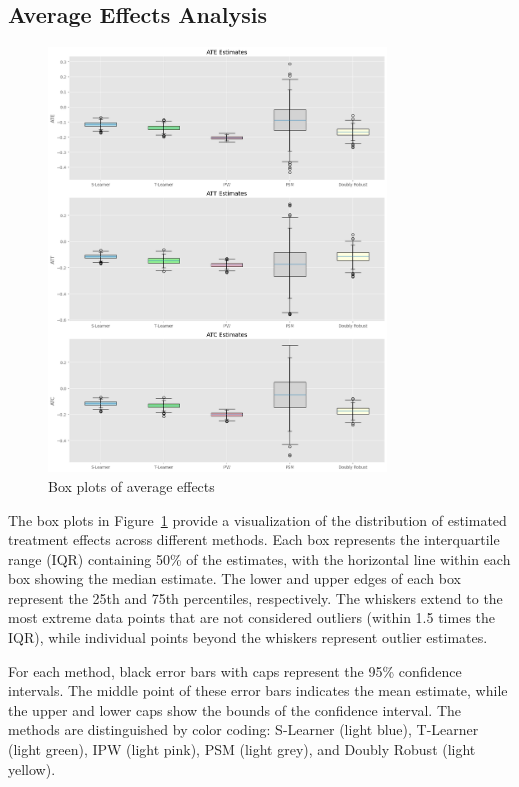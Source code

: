 \documentclass{article}
\begin{document}
\subsection{Average Effects Analysis}

\begin{figure}[!ht]
    \centering
    \caption{Box plots of average effects}
    \label{fig:box_plots}
    \includegraphics[width = 0.8\textwidth]{plots/box_plots.png}
\end{figure}

The box plots in Figure~\ref{fig:box_plots} provide a visualization of the distribution of estimated treatment effects across different methods. Each box represents the interquartile range (IQR) containing 50\% of the estimates, with the horizontal line within each box showing the median estimate. The lower and upper edges of each box represent the 25th and 75th percentiles, respectively. The whiskers extend to the most extreme data points that are not considered outliers (within 1.5 times the IQR), while individual points beyond the whiskers represent outlier estimates.

For each method, black error bars with caps represent the 95\% confidence intervals. The middle point of these error bars indicates the mean estimate, while the upper and lower caps show the bounds of the confidence interval. The methods are distinguished by color coding: S-Learner (light blue), T-Learner (light green), IPW (light pink), PSM (light grey), and Doubly Robust (light yellow).
\end{document}

